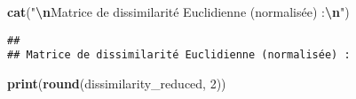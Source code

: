\documentclass[
]{article}
\newenvironment{Shaded}{\begin{snugshade}}{\end{snugshade}}
\newcommand{\DecValTok}[1]{\textcolor[rgb]{0.00,0.00,0.81}{#1}}
\newcommand{\FunctionTok}[1]{\textcolor[rgb]{0.13,0.29,0.53}{\textbf{#1}}}
\newcommand{\NormalTok}[1]{#1}
\newcommand{\SpecialCharTok}[1]{\textcolor[rgb]{0.81,0.36,0.00}{\textbf{#1}}}
\newcommand{\StringTok}[1]{\textcolor[rgb]{0.31,0.60,0.02}{#1}}
\begin{document}
\begin{Shaded}
\begin{Highlighting}[]
\FunctionTok{cat}\NormalTok{(}\StringTok{"}\SpecialCharTok{\textbackslash{}n}\StringTok{Matrice de dissimilarité Euclidienne (normalisée) :}\SpecialCharTok{\textbackslash{}n}\StringTok{"}\NormalTok{)}
\end{Highlighting}
\end{Shaded}

\begin{verbatim}
## 
## Matrice de dissimilarité Euclidienne (normalisée) :
\end{verbatim}

\begin{Shaded}
\begin{Highlighting}[]
\FunctionTok{print}\NormalTok{(}\FunctionTok{round}\NormalTok{(dissimilarity\_reduced, }\DecValTok{2}\NormalTok{))}
\end{Highlighting}
\end{Shaded}
\end{document}
